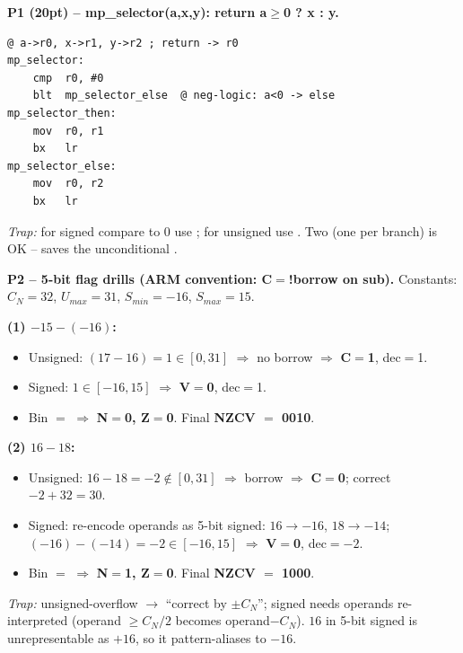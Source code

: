 \begin{qp}\textbf{P1 (20pt) -- mp\_selector(a,x,y): return a$\geq$0 ? x : y.}
\begin{lstlisting}
@ a->r0, x->r1, y->r2 ; return -> r0
mp_selector:
    cmp  r0, #0
    blt  mp_selector_else  @ neg-logic: a<0 -> else
mp_selector_then:
    mov  r0, r1
    bx   lr
mp_selector_else:
    mov  r0, r2
    bx   lr
\end{lstlisting}
\emph{Trap:} for signed compare to 0 use ; for unsigned use . Two  (one per branch) is OK -- saves the unconditional .
\end{qp}

\begin{qp}\textbf{P2 -- 5-bit flag drills (ARM convention: C$=$\textbf{!borrow} on sub).}
Constants: $C_N{=}32$, $U_{\!max}{=}31$, $S_{min}{=}-16$, $S_{max}{=}15$.

\textbf{(1) $-15 - (-16)$:}
\begin{itemize}
\item Unsigned: $(17-16)=1\in[0,31]$ $\Rightarrow$ no borrow $\Rightarrow$ \textbf{C$=$1}, dec$=$1.
\item Signed: $1\in[-16,15]$ $\Rightarrow$ \textbf{V$=$0}, dec$=$1.
\item Bin $=$  $\Rightarrow$ \textbf{N$=$0, Z$=$0}. Final \textbf{NZCV $=$ 0010}.
\end{itemize}

\textbf{(2) $16 - 18$:}
\begin{itemize}
\item Unsigned: $16-18 = -2\notin[0,31]$ $\Rightarrow$ borrow $\Rightarrow$ \textbf{C$=$0}; correct $-2{+}32=30$.
\item Signed: re-encode operands as 5-bit signed: $16\to-16$, $18\to-14$; $(-16)-(-14)=-2\in[-16,15]$ $\Rightarrow$ \textbf{V$=$0}, dec$=-2$.
\item Bin $=$  $\Rightarrow$ \textbf{N$=$1, Z$=$0}. Final \textbf{NZCV $=$ 1000}.
\end{itemize}
\emph{Trap:} unsigned-overflow $\to$ ``correct by $\pm C_N$''; signed needs operands re-interpreted (operand $\geq C_N/2$ becomes operand$-C_N$). $16$ in 5-bit signed is unrepresentable as $+16$, so it pattern-aliases to $-16$.
\end{qp}

